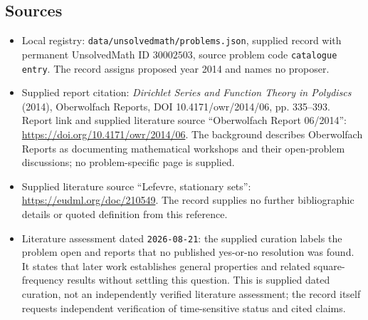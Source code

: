 \documentclass[11pt]{article}
\begin{document}
\subsection{Sources}
\begin{itemize}
\item Local registry: \texttt{data/unsolvedmath/problems.json}, supplied record with permanent UnsolvedMath ID \(30002503\), source problem code \texttt{catalogue entry}. The record assigns proposed year 2014 and names no proposer.
\item Supplied report citation: \emph{Dirichlet Series and Function Theory in Polydiscs} (2014), Oberwolfach Reports, DOI 10.4171/owr/2014/06, pp. 335--393. Report link and supplied literature source ``Oberwolfach Report 06/2014'': \url{https://doi.org/10.4171/owr/2014/06}. The background describes Oberwolfach Reports as documenting mathematical workshops and their open-problem discussions; no problem-specific page is supplied.
\item Supplied literature source ``Lefevre, stationary sets'': \url{https://eudml.org/doc/210549}. The record supplies no further bibliographic details or quoted definition from this reference.
\item Literature assessment dated \texttt{2026-08-21}: the supplied curation labels the problem open and reports that no published yes-or-no resolution was found. It states that later work establishes general properties and related square-frequency results without settling this question. This is supplied dated curation, not an independently verified literature assessment; the record itself requests independent verification of time-sensitive status and cited claims.
\end{itemize}
\end{document}
